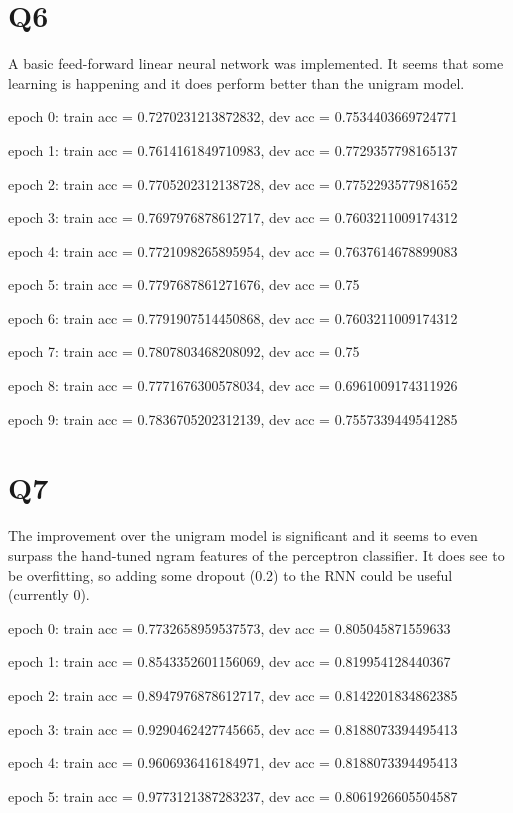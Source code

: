 \documentclass[11pt]{article}
\begin{document}
\section*{Q6}

A basic feed-forward linear neural network was implemented. It seems that some learning is happening and it does perform
better than the unigram model. 

epoch 0: train acc = 0.7270231213872832, dev acc = 0.7534403669724771

epoch 1: train acc = 0.7614161849710983, dev acc = 0.7729357798165137

epoch 2: train acc = 0.7705202312138728, dev acc = 0.7752293577981652

epoch 3: train acc = 0.7697976878612717, dev acc = 0.7603211009174312

epoch 4: train acc = 0.7721098265895954, dev acc = 0.7637614678899083

epoch 5: train acc = 0.7797687861271676, dev acc = 0.75

epoch 6: train acc = 0.7791907514450868, dev acc = 0.7603211009174312

epoch 7: train acc = 0.7807803468208092, dev acc = 0.75

epoch 8: train acc = 0.7771676300578034, dev acc = 0.6961009174311926

epoch 9: train acc = 0.7836705202312139, dev acc = 0.7557339449541285

\section*{Q7}

The improvement over the unigram model is significant and it seems to even surpass the hand-tuned ngram features of the perceptron
classifier. It does see to be overfitting, so adding some dropout (0.2) to the RNN could be useful (currently 0).

epoch 0: train acc = 0.7732658959537573, dev acc = 0.805045871559633

epoch 1: train acc = 0.8543352601156069, dev acc = 0.819954128440367

epoch 2: train acc = 0.8947976878612717, dev acc = 0.8142201834862385

epoch 3: train acc = 0.9290462427745665, dev acc = 0.8188073394495413

epoch 4: train acc = 0.9606936416184971, dev acc = 0.8188073394495413

epoch 5: train acc = 0.9773121387283237, dev acc = 0.8061926605504587
\end{document}

